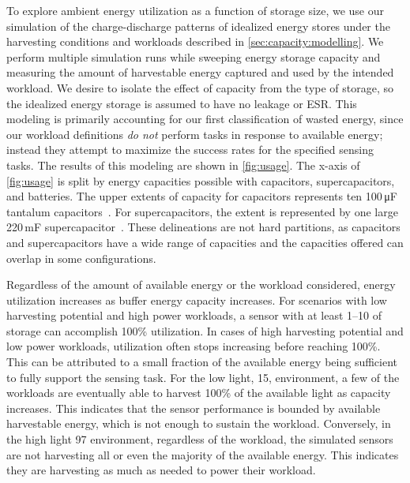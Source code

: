 To explore ambient energy utilization as a function of storage size, we
use our simulation of the charge-discharge patterns of idealized energy stores under
the harvesting conditions and workloads described in \cref{sec:capacity:modelling}.
We perform multiple simulation runs while sweeping energy storage capacity and measuring the amount of harvestable energy captured and used by the intended workload.
We desire to isolate the effect of capacity from the type of storage, so the
idealized energy storage is assumed to have no leakage or ESR. 
This modeling is primarily accounting for our first classification of
wasted energy, since our workload definitions \textit{do not} perform
tasks in response to available energy; instead they attempt to maximize the success
rates for the specified sensing tasks.
The results of this modeling are shown in \cref{fig:usage}.
The x-axis of \cref{fig:usage} is split by energy capacities possible with capacitors, supercapacitors, and
batteries. 
The upper extents of capacity for capacitors represents ten 100\,\si{\micro\farad} tantalum capacitors~\cite{tantalumDatasheet}. 
For supercapacitors, the extent is represented by one
large 220\,mF supercapacitor~\cite{murataCap}. 
These delineations are not hard partitions, as capacitors and supercapacitors have a wide range of capacities and the capacities offered can overlap in some configurations.

Regardless of the amount of available energy or the workload considered, energy utilization increases as
buffer energy capacity increases. 
For scenarios with low harvesting potential and high
power workloads, a sensor with at least 1--10\ssi{\milli\Wh} of storage can accomplish 100\% utilization.
In cases of
high harvesting potential and low power workloads, utilization often
stops increasing before reaching 100\%. This
can be attributed to a small fraction of the available energy being sufficient
to fully support the sensing task.
For the low light, 15\ssi[per-mode=symbol]{\micro\watt\per\centi\meter\squared}, environment, a few of the workloads are eventually able to harvest 100\% of the available light as capacity increases. This indicates that the sensor performance is bounded by available harvestable energy, which is not enough to sustain the workload.
Conversely, in the high light 97\ssi[per-mode=symbol]{\micro\watt\per\centi\meter\squared} environment, regardless of the workload, the simulated sensors are not harvesting all or even the majority of the available energy. 
This indicates they are harvesting as much as needed to power their workload. 

